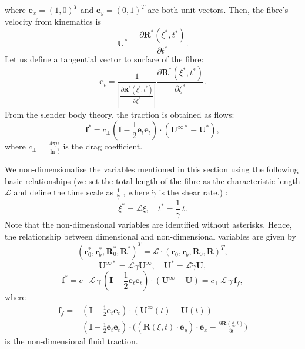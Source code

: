 \documentclass[lineno]{JFM-FLM_Au}
\begin{document}
where $\mathbf{e}_x=(1,0)^T$ and $\mathbf{e}_y=(0,1)^T$ are both unit vectors. Then, the fibre's velocity from kinematics is 
\begin{equation}
	\label{eqn:22}
	\mathbf{U}^*=\frac{\partial\mathbf{R}^*(\xi^*,t^*)}{\partial t^*}.
\end{equation}
Let us define a tangential vector to surface of the fibre:
\begin{equation}
	\label{eqn:23}
	\mathbf{e}_t=\frac{1}{|\frac{\partial\mathbf{R}^*(\xi^*,t^*)}{\partial\xi^*}|}\frac{\partial\mathbf{R}^*(\xi^*,t^*)}{\partial\xi^*}.
\end{equation}
From the slender body theory, the traction is obtained as flows:
\begin{equation}
	\label{eqn:24}
	\mathbf{f}^*=c_\perp\left(\mathbf{I}-\frac{1}{2}\mathbf{e}_t\mathbf{e}_t\right)\cdot(\mathbf{U}^{\infty*}-\mathbf{U}^*),
\end{equation}
where $c_\perp=\frac{4\pi\mu}{\ln{\frac{1}{\epsilon}}}$ is the drag coefficient. 

We non-dimensionalise the variables mentioned in this section using the following basic relationships (we set the total length
of the fibre as the characteristic length $\mathcal{L}$ and define the time scale as $\frac{1}{\dot{\gamma}}$ , where $\dot{\gamma}$ is the shear rate.) :
\begin{equation}
	\label{eqn:25}
	\xi^*=\mathcal{L}\xi, \quad t^*=\frac{1}{\dot{\gamma}}\,t.
\end{equation}
Note that the non-dimensional variables are identified without asterisks.
Hence, the relationship between dimensional and non-dimensional variables are given by
\begin{equation}
	\label{eqn:26}
	(\mathbf{r}_0^*, \mathbf{r}_b^*, \mathbf{R}_0^*, \mathbf{R}^*)^T=\mathcal{L}\cdot(\mathbf{r}_0, \mathbf{r}_b, \mathbf{R}_0, \mathbf{R})^T,
\end{equation}
\begin{equation}
	\label{eqn:27}
	\mathbf{U}^{\infty*}=\mathcal{L}\dot{\gamma}\mathbf{U}^{\infty}, \quad \mathbf{U}^*=\mathcal{L}\dot{\gamma}\mathbf{U},
\end{equation}
\begin{equation}
	\label{eqn:28}
	\mathbf{f}^*=c_\perp\,\mathcal{L}\,\dot{\gamma}\,\left(\mathbf{I}-\frac{1}{2}\mathbf{e}_t\mathbf{e}_t\right)\cdot(\mathbf{U}^{\infty}-\mathbf{U})=c_\perp\,\mathcal{L}\,\dot{\gamma}\,\mathbf{f}_{f},
\end{equation}
where 
\begin{equation}
	\label{eqn:101}
	\begin{aligned}
		\mathbf{f}_f=&\left(\mathbf{I}-\frac{1}{2}\mathbf{e}_t\mathbf{e}_t\right)\cdot(\mathbf{U}^{\infty}(t)-\mathbf{U}(t))\\
		=&\left(\mathbf{I}-\frac{1}{2}\mathbf{e}_t\mathbf{e}_t\right)\cdot\Big((\mathbf{\mathbf{R}}(\xi,t)\cdot\mathbf{e}_y)\cdot\mathbf{e}_x-\frac{\partial\mathbf{R}(\xi,t)}{\partial t}\Big)
	\end{aligned}
\end{equation}
is the non-dimensional fluid traction. 
\end{document}
